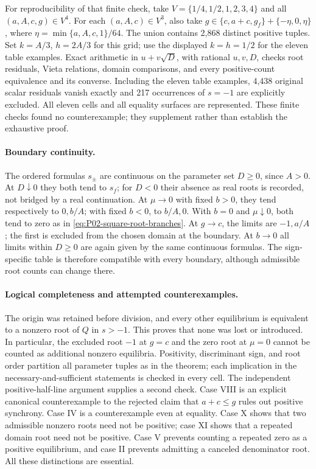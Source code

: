 For reproducibility of that finite check, take
$V=\{1/4,1/2,1,2,3,4\}$ and all $(a,A,c,g)\in V^4$.
For each $(a,A,c)\in V^3$, also take
$g\in\{c,a+c,g_f\}+\{-\eta,0,\eta\}$, where
$\eta=\min\{a,A,c,1\}/64$. The union contains 2,868 distinct
positive tuples. Set $k=A/3$, $h=2A/3$ for this grid; use the
displayed $k=h=1/2$ for the eleven table examples. Exact arithmetic
in $u+v\sqrt D$, with rational $u,v,D$, checks root residuals,
Vieta relations, domain comparisons, and every positive-count
equivalence and its converse. Including the eleven table examples,
4,438 original scalar residuals vanish exactly and 217 occurrences
of $s=-1$ are explicitly excluded. All eleven cells and all equality
surfaces are represented. These finite checks found no counterexample;
they supplement rather than establish the exhaustive proof.

\paragraph{Boundary continuity.}
The ordered formulas $s_\pm$ are continuous on the parameter set
$D\ge0$, since $A>0$. At $D\downarrow0$ they both tend to $s_f$;
for $D<0$ their absence as real roots is recorded, not bridged by
a real continuation. At $\mu\to0$ with fixed $b>0$, they tend
respectively to $0,b/A$; with fixed $b<0$, to $b/A,0$. With $b=0$
and $\mu\downarrow0$, both tend to zero as in
\eqref{eq:P02-square-root-branches}. At $g\to c$, the limits are
$-1,a/A$; the first is excluded from the chosen domain at the boundary.
At $b\to0$ all limits within $D\ge0$ are again given by the same
continuous formulas. The sign-specific table is therefore compatible
with every boundary, although admissible root counts can change there.

\clearpage
\paragraph{Logical completeness and attempted counterexamples.}
The origin was retained before division, and every other equilibrium
is equivalent to a nonzero root of $Q$ in $s>-1$. This proves that
none was lost or introduced. In particular, the excluded root $-1$
at $g=c$ and the zero root at $\mu=0$ cannot be counted as additional
nonzero equilibria. Positivity, discriminant sign, and root order
partition all parameter tuples as in the theorem; each implication
in the necessary-and-sufficient statements is checked in every cell.
The independent positive-half-line argument supplies a second check.
Case VIII is an explicit canonical counterexample to the rejected
claim that $a+c\le g$ rules out positive synchrony. Case IV is a
counterexample even at equality. Case X shows that two admissible
nonzero roots need not be positive; case XI shows that a repeated
domain root need not be positive. Case V prevents counting a repeated
zero as a positive equilibrium, and case II prevents admitting a
canceled denominator root. All these distinctions are essential.

